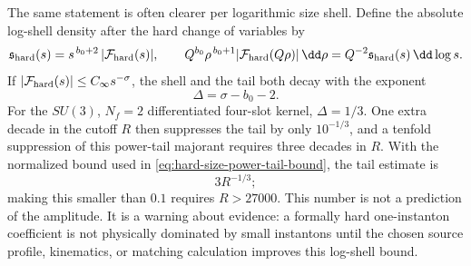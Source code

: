 \begin{controlledapproximation}
The same statement is often clearer per logarithmic size shell.  Define the
absolute log-shell density after the hard change of variables by
\begin{equation}
  \mathfrak s_{\rm hard}(s)
  =
  s^{\,b_0+2}\,
  |\mathcal F_{\rm hard}(s)|,
  \qquad
  Q^{b_0}\rho^{\,b_0+1}
  |\mathcal F_{\rm hard}(Q\rho)|\,\dd\rho
  =
  Q^{-2}\mathfrak s_{\rm hard}(s)\,\dd\log s .
  \label{eq:hard-instanton-log-size-shell}
\end{equation}
If \(|\mathcal F_{\rm hard}(s)|\le C_\infty s^{-\sigma}\), the shell and the
tail both decay with the exponent
\[
  \Delta=\sigma-b_0-2 .
\]
For the \(SU(3)\), \(N_f=2\) differentiated four-slot kernel,
\(\Delta=1/3\).  One extra decade in the cutoff \(R\) then suppresses the
tail by only \(10^{-1/3}\), and a tenfold suppression of this power-tail
majorant requires three decades in \(R\).  With the normalized bound used in
\eqref{eq:hard-size-power-tail-bound}, the tail estimate is
\[
  3R^{-1/3};
\]
making this smaller than \(0.1\) requires \(R>27000\).  This number is not a
prediction of the amplitude.  It is a warning about evidence: a formally hard
one-instanton coefficient is not physically dominated by small instantons
until the chosen source profile, kinematics, or matching calculation improves
this log-shell bound.
\end{controlledapproximation}


